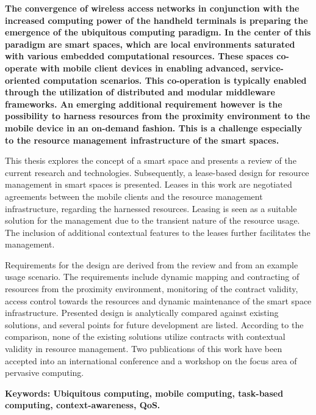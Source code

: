 {\bfseries \noindent The convergence of wireless access networks in conjunction with the increased computing power of the handheld terminals is preparing the emergence of the ubiquitous computing paradigm. In the center of this paradigm are smart spaces, which are local environments saturated with various embedded computational resources. These spaces co-operate with mobile client devices in enabling advanced, service-oriented computation scenarios. This co-operation is typically enabled through the utilization of distributed and modular middleware frameworks. An emerging additional requirement however is the possibility to harness resources from the proximity environment to the mobile device in an on-demand fashion. This is a challenge especially to the resource management infrastructure of the smart spaces.

This thesis explores the concept of a smart space and presents a review of the current research and technologies. Subsequently, a lease-based design for resource management in smart spaces is presented. Leases in this work are negotiated agreements between the mobile clients and the resource management infrastructure, regarding the harnessed resources. Leasing is seen as a suitable solution for the management due to the transient nature of the resource usage. The inclusion of additional contextual features to the leases further facilitates the management.

Requirements for the design are derived from the review and from an example usage scenario. The requirements include dynamic mapping and contracting of resources from the proximity environment, monitoring of the contract validity, access control towards the resources and dynamic maintenance of the smart space infrastructure. Presented design is analytically compared against existing solutions, and several points for future development are listed. According to the comparison, none of the existing solutions utilize contracts with contextual validity in resource management. Two publications of this work have been accepted into an international conference and a workshop on the focus area of pervasive computing.

\vspace{1\baselineskip}
\noindent\textbf{Keywords: Ubiquitous computing, mobile computing, task-based computing, context-awareness, QoS.}
}
